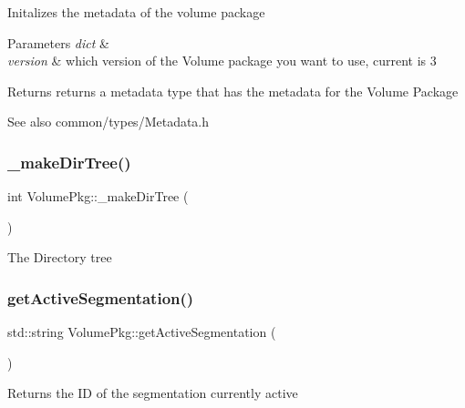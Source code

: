 Initalizes the metadata of the volume package 
\begin{DoxyParams}{Parameters}
{\em dict} & \\
\hline
{\em version} & which version of the Volume package you want to use, current is 3 \\
\hline
\end{DoxyParams}
\begin{DoxyReturn}{Returns}
returns a metadata type that has the metadata for the Volume Package 
\end{DoxyReturn}
\begin{DoxySeeAlso}{See also}
common/types/\+Metadata.\+h 
\end{DoxySeeAlso}
\hypertarget{classVolumePkg_ac141a45c12eb8e53def13282b2594ebe}{}\label{classVolumePkg_ac141a45c12eb8e53def13282b2594ebe} 
\subsubsection{\texorpdfstring{\+\_\+make\+Dir\+Tree()}{\_makeDirTree()}}
{\footnotesize\ttfamily int Volume\+Pkg\+::\+\_\+make\+Dir\+Tree (\begin{DoxyParamCaption}{ }\end{DoxyParamCaption})\hspace{0.3cm}{\ttfamily [private]}}

The Directory tree \hypertarget{classVolumePkg_ab603499204250e15b5532acb51e750d6}{}\label{classVolumePkg_ab603499204250e15b5532acb51e750d6} 
\subsubsection{\texorpdfstring{get\+Active\+Segmentation()}{getActiveSegmentation()}}
{\footnotesize\ttfamily std\+::string Volume\+Pkg\+::get\+Active\+Segmentation (\begin{DoxyParamCaption}{ }\end{DoxyParamCaption})}

\begin{DoxyReturn}{Returns}
the ID of the segmentation currently active 
\end{DoxyReturn}
\hypertarget{classVolumePkg_a7af137a5ab84ca0b945faef2adf2a75f}{}\label{classVolumePkg_a7af137a5ab84ca0b945faef2adf2a75f} 
